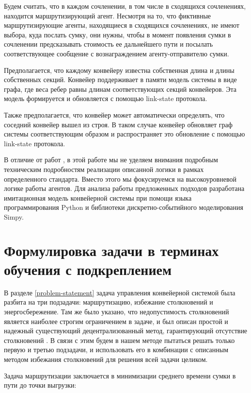 \documentclass[specification,annotation,times]{itmo-student-thesis}
\theoremstyle{definition}
\begin{document}
Будем считать, что в каждом сочленении, в том числе в сходящихся сочленениях,
находится маршрутизирующий агент. Несмотря на то, что фиктивные маршрутизирующие
агенты, находящиеся в сходящихся сочленениях, не имеют выбора, куда послать
сумку, они нужны, чтобы в момент появления сумки в сочленении предсказывать
стоимость ее дальнейшего пути и посылать соответствующее сообщение с
вознаграждением агенту-отправителю сумки.

Предполагается, что каждому конвейеру известна собственная длина и длины
собственных секций. Конвейер поддерживает в памяти модель системы в виде графа,
где веса ребер равны длинам соответствующих секций конвейеров. Эта модель
формируется и обновляется с помощью link-state протокола.

Также предполагается, что конвейер может автоматически определять, что соседний
конвейер вышел из строя. В таком случае конвейер обновляет граф системы
соответствующим образом и распространяет это обновление с помощью link-state
протокола.

В отличие от работ \cite{black2009intelligent, vyatkin-controllers}, в этой
работе мы не уделяем внимания подробным техническим подробностям реализации
описанной логики в рамках определенного стандарта. Вместо этого мы фокусируемся
на высокоуровневой логике работы агентов. Для анализа работы предложенных
подходов разработана имитационная модель конвейерной системы при помощи языка
программирования Python и библиотеки дискретно-событийного моделирования Simpy.

\section{Формулировка задачи в терминах обучения с подкреплением}\label{rl-task-formulation}

В разделе \ref{problem-statement} задача управления конвейерной системой была
разбита на три подзадачи: маршрутизацию, избежание столкновений и
энергосбережение. Там же было указано, что недопустимость столкновений является
наиболее строгим ограничением в задаче, и был описан простой и надежный
существующий децентрализованный метод, гарантирующий отсутствие столкновений
\cite{black2009intelligent}. В связи с этим будем в нашем методе пытаться решать
только первую и третью подзадачи, и использовать его в комбинации с описанным
методом избежания столкновений для решения всей задачи целиком.

Задача маршрутизации заключается в минимизации среднего времени сумки в пути до
точки выгрузки:
\end{document}
